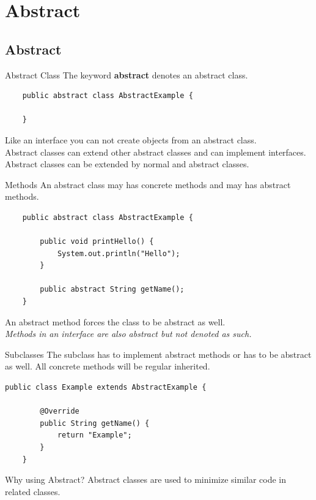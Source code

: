 \section{Abstract}
\subsection{Abstract}
\begin{frame}[fragile]{Abstract Class}
	The keyword \textbf{abstract} denotes an abstract class.
	\vfill
	\begin{lstlisting}
	public abstract class AbstractExample {
	
	}	
	\end{lstlisting}
	\vfill
	Like an interface you can not create objects from an abstract class.\\
	Abstract classes can extend other abstract classes and can implement interfaces.\\
	Abstract classes can be extended by normal and abstract classes.
\end{frame}

\begin{frame}[fragile]{Methods}
	An abstract class may has concrete methods and may has abstract methods.
	\begin{lstlisting}
	public abstract class AbstractExample {
	
	    public void printHello() {
	        System.out.println("Hello");	    
	    }
	    
	    public abstract String getName();
	}	
	\end{lstlisting}
	An abstract method forces the class to be abstract as well. \\
	\emph{Methods in an interface are also abstract but not denoted as such.}
\end{frame}

\begin{frame}[fragile]{Subclasses}
	The subclass has to implement abstract methods or has to be abstract as well.
	All concrete methods will be regular inherited.
	\begin{lstlisting}[escapechar=!]
	public class Example extends AbstractExample {
	    
	    @Override
	    public String getName() {
	        return "Example";	    
	    }
	}	
	\end{lstlisting}
\end{frame}

\begin{frame}{Why using Abstract?}
	Abstract classes are used to minimize similar code in related classes.
\end{frame}

